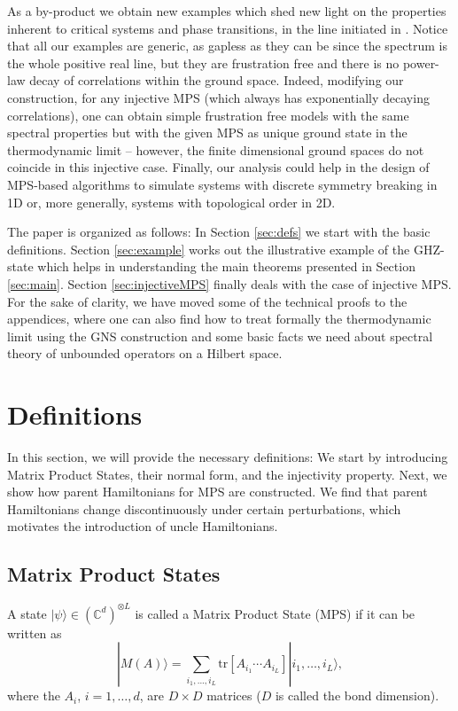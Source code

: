 \documentclass[cmp]{svjour}
\newcommand{\tr}{\mathrm{tr}}
\newcommand{\C}{\mathbb{C}}
\newcommand{\ket}[1]{|#1\rangle}
\begin{document}
As a by-product we obtain new examples which shed new light on the properties inherent to critical systems and phase transitions, in the line initiated in \cite{wolf:phasetransitions-mps}. Notice that all our examples are generic, as gapless as they can be since the spectrum is the whole positive real line, but they are frustration free and there is no power-law decay of correlations within the ground space. Indeed, modifying our construction, for any injective MPS (which always has exponentially decaying correlations), one can obtain simple frustration free models with the same spectral properties but with the given MPS as unique ground state in the thermodynamic limit -- however, the finite dimensional ground spaces do not coincide in this injective case.  Finally, our analysis could help in the design of MPS-based algorithms to simulate systems with discrete symmetry breaking in 1D or, more generally, systems with topological order in 2D.

The paper is organized as follows:  In Section \ref{sec:defs} we start with the basic definitions. Section \ref{sec:example} works out the illustrative example of the GHZ-state which helps in understanding the main theorems presented in Section \ref{sec:main}. Section \ref{sec:injectiveMPS} finally deals with the case of injective MPS. For the sake of clarity, we have moved some of the technical proofs to the appendices, where one can also find how to treat formally the thermodynamic limit using the GNS construction and some basic facts we need about  spectral theory of unbounded operators on a Hilbert space.

\section{\label{sec:defs}
  Definitions}

In this section, we will provide the necessary definitions: We start by introducing Matrix Product States, their normal form,
and the injectivity property. Next, we show how parent Hamiltonians for
MPS are constructed.  We find that parent Hamiltonians change
discontinuously under certain perturbations, which motivates the
introduction of uncle Hamiltonians.


\subsection{Matrix Product States}


\begin{definition}\label{MPS}
    A state $\ket{\psi}\in (\C ^d)^{\otimes L}$ is called a Matrix Product
    State (MPS) if it can be written as
    \begin{equation}
        \label{eq:mps-def}
        \ket{M(A)} = \sum _{i_1,...,i_L}
        \tr[A_{i_1} \cdots A_{i_L}] \ket{ i_1,\dots,i_L},
    \end{equation}
    where the $A_i$, $i=1,\dots,d$, are $D\times D$ matrices ($D$ is called
    the bond dimension).
\end{definition}
\end{document}
